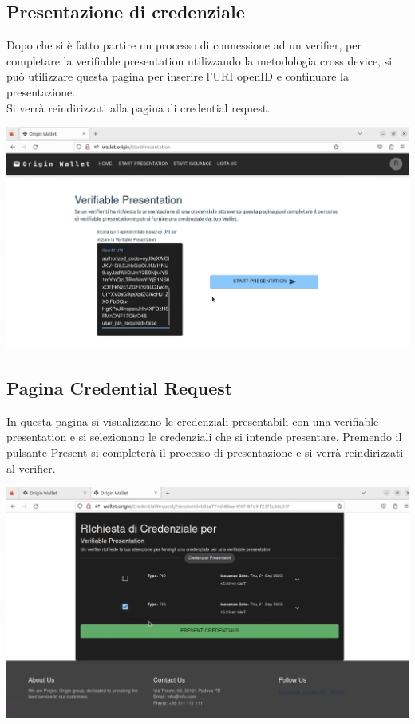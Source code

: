 \subsection{Presentazione di credenziale}
Dopo che si è fatto partire un processo di connessione ad un verifier, per completare la verifiable presentation utilizzando la metodologia cross device, si può utilizzare questa pagina per inserire l'URI openID e continuare la presentazione.\\
Si verrà reindirizzati alla pagina di credential request.
\begin{center}
\includegraphics[scale = 0.2]{./res/img/wallet/new/wallet_presentation.png}
\end{center}
\subsection{Pagina Credential Request}
In questa pagina si visualizzano le credenziali presentabili con una verifiable presentation e si selezionano le credenziali che si intende presentare. Premendo il pulsante Present si completerà il processo di presentazione e si verrà reindirizzati al verifier.
\begin{center}
\includegraphics[scale = 0.2]{./res/img/wallet/new/wallet_present.png}
\end{center}